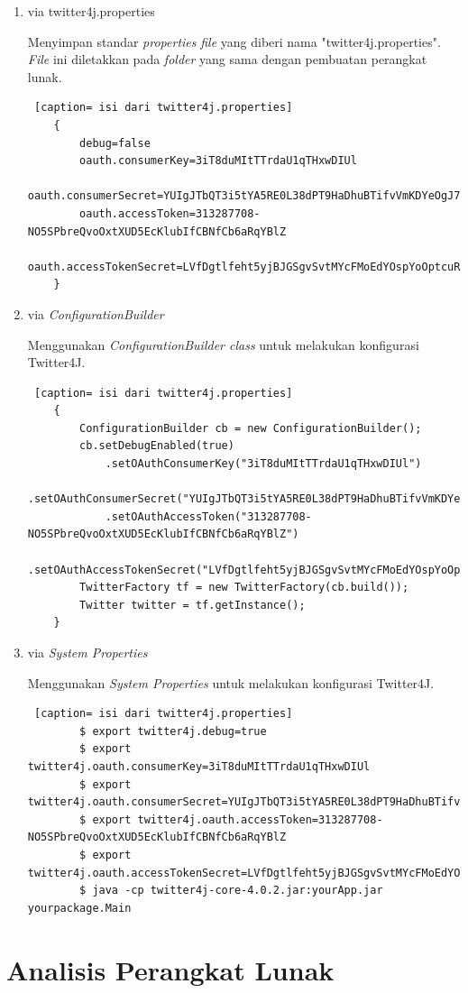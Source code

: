 \begin{enumerate}
	\item via twitter4j.properties
	
	Menyimpan standar \textit{properties} \textit{file} yang diberi nama "twitter4j.properties". \textit{File} ini diletakkan pada \textit{folder} yang sama dengan pembuatan perangkat lunak.
	\begin{lstlisting} [caption= isi dari twitter4j.properties]
	{
		debug=false
		oauth.consumerKey=3iT8duMItTTrdaU1qTHxwDIUl
		oauth.consumerSecret=YUIgJTbQT3i5tYA5RE0L38dPT9HaDhuBTifvVmKDYeOgJ7t313
		oauth.accessToken=313287708-NO5SPbreQvoOxtXUD5EcKlubIfCBNfCb6aRqYBlZ
		oauth.accessTokenSecret=LVfDgtlfeht5yjBJGSgvSvtMYcFMoEdYOspYoOptcuR4i
	}
	\end{lstlisting}
	\item via \textit{ConfigurationBuilder}
	
	Menggunakan \textit{ConfigurationBuilder class} untuk melakukan konfigurasi Twitter4J.
	\begin{lstlisting} [caption= isi dari twitter4j.properties]
	{
		ConfigurationBuilder cb = new ConfigurationBuilder();
		cb.setDebugEnabled(true)
			.setOAuthConsumerKey("3iT8duMItTTrdaU1qTHxwDIUl")
			.setOAuthConsumerSecret("YUIgJTbQT3i5tYA5RE0L38dPT9HaDhuBTifvVmKDYeOgJ7****")
			.setOAuthAccessToken("313287708-NO5SPbreQvoOxtXUD5EcKlubIfCBNfCb6aRqYBlZ")
			.setOAuthAccessTokenSecret("LVfDgtlfeht5yjBJGSgvSvtMYcFMoEdYOspYoOptc****");
		TwitterFactory tf = new TwitterFactory(cb.build());
		Twitter twitter = tf.getInstance();
	}
	\end{lstlisting}
	\item via \textit{System Properties}
	
	Menggunakan \textit{System Properties} untuk melakukan konfigurasi Twitter4J.
	\begin{lstlisting} [caption= isi dari twitter4j.properties]
		$ export twitter4j.debug=true
		$ export twitter4j.oauth.consumerKey=3iT8duMItTTrdaU1qTHxwDIUl
		$ export twitter4j.oauth.consumerSecret=YUIgJTbQT3i5tYA5RE0L38dPT9HaDhuBTifvVmKDYeOgJ7****
		$ export twitter4j.oauth.accessToken=313287708-NO5SPbreQvoOxtXUD5EcKlubIfCBNfCb6aRqYBlZ
		$ export twitter4j.oauth.accessTokenSecret=LVfDgtlfeht5yjBJGSgvSvtMYcFMoEdYOspYoOptc****
		$ java -cp twitter4j-core-4.0.2.jar:yourApp.jar yourpackage.Main
	\end{lstlisting}
\end{enumerate}

\section{Analisis Perangkat Lunak}

